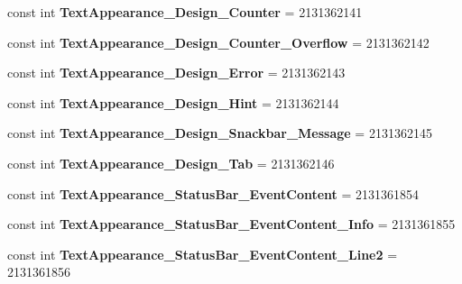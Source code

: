 \begin{DoxyCompactItemize}
\item 
\mbox{\label{classXaria_1_1Resource_1_1Style_a5cc8add137ce53e4969ebccf58d2e4fe}} 
const int {\bfseries Text\+Appearance\+\_\+\+Design\+\_\+\+Counter} = 2131362141
\item 
\mbox{\label{classXaria_1_1Resource_1_1Style_ae34837afdd2caf223a6a1ae2edfca185}} 
const int {\bfseries Text\+Appearance\+\_\+\+Design\+\_\+\+Counter\+\_\+\+Overflow} = 2131362142
\item 
\mbox{\label{classXaria_1_1Resource_1_1Style_a1e9033b1f2ea6ebf64fd2eb42cc50c3b}} 
const int {\bfseries Text\+Appearance\+\_\+\+Design\+\_\+\+Error} = 2131362143
\item 
\mbox{\label{classXaria_1_1Resource_1_1Style_ad63dca86c1e3f83044feaff069ed8086}} 
const int {\bfseries Text\+Appearance\+\_\+\+Design\+\_\+\+Hint} = 2131362144
\item 
\mbox{\label{classXaria_1_1Resource_1_1Style_a645bffa62831391f561629c3a3cbde03}} 
const int {\bfseries Text\+Appearance\+\_\+\+Design\+\_\+\+Snackbar\+\_\+\+Message} = 2131362145
\item 
\mbox{\label{classXaria_1_1Resource_1_1Style_aebd56d2db8251d6522af210d25c491bd}} 
const int {\bfseries Text\+Appearance\+\_\+\+Design\+\_\+\+Tab} = 2131362146
\item 
\mbox{\label{classXaria_1_1Resource_1_1Style_a3bbcce53d6f0059c16ac54290a9ad80c}} 
const int {\bfseries Text\+Appearance\+\_\+\+Status\+Bar\+\_\+\+Event\+Content} = 2131361854
\item 
\mbox{\label{classXaria_1_1Resource_1_1Style_a5ff1e42485bdd526a24e453cf418cf3b}} 
const int {\bfseries Text\+Appearance\+\_\+\+Status\+Bar\+\_\+\+Event\+Content\+\_\+\+Info} = 2131361855
\item 
\mbox{\label{classXaria_1_1Resource_1_1Style_a0669c1ae566168b07dd9dc1a4dc432d7}} 
const int {\bfseries Text\+Appearance\+\_\+\+Status\+Bar\+\_\+\+Event\+Content\+\_\+\+Line2} = 2131361856

\end{DoxyCompactItemize}
